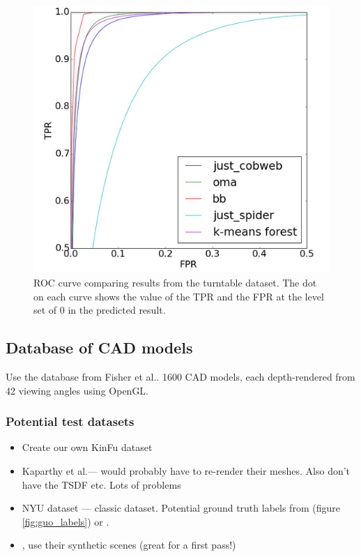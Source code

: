 \documentclass[10pt,twocolumn,letterpaper]{article}
\makeatletter
\newcommand*{\ea}{et al.\@\xspace}
\makeatother
\begin{document}
\begin{figure}[bt]
  \centering 
  \includegraphics[width=0.9\columnwidth]{roc_curve}
  \caption{ROC curve comparing results from the turntable dataset. 
  The dot on each curve shows the value of the TPR and the FPR at the level set of 0 in the predicted result.}
  \label{fig:bigbird_roc}
\end{figure}




\subsection{Database of CAD models}
Use the database from Fisher \ea \cite{fisher-siggraphasia-2012}.
1600 CAD models, each depth-rendered from 42 viewing angles using OpenGL.

\subsubsection{Potential test datasets}
\begin{itemize}
\item Create our own KinFu dataset
\item Kaparthy \ea --- would probably have to re-render their meshes.
Also don't have the TSDF etc. Lots of problems
\item NYU dataset --- classic dataset. Potential ground truth labels from \cite{guo-iccv-2013} (figure \ref{fig:guo_labels}) or \cite{kim-iccv-2013}.
\item \cite{fisher-siggraphasia-2012}, use their synthetic scenes (great for a first pass!)
\end{itemize}
\end{document}
